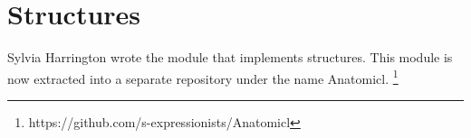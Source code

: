 \chapter{Structures}
\label{chap-structures}

Sylvia Harrington wrote the \sysname{} module that implements
structures.  This module is now extracted into a separate repository
under the name Anatomicl.%
\footnote{https://github.com/s-expressionists/Anatomicl}
